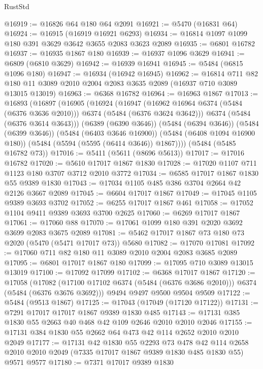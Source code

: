 \begin{lexlean}{RustStd}
\begin{coremodule}
{\begin{coremodule}
{{{{{{{{{{{{{{{{{{{{{{{{{{{{{{{@16919 := @16826 @64 @180 @64 @2091
@16921 := @5470 (@16831 @64)
@16924 := @16915 (@16919 @16921 @6293)
@16934 := @16814 @1097 @1099 @180 @391 @3629 @3642 @3655 @2083 @3623 @2089
@16935 := @6801 @16782
@16937 := @16935 @1867 @180
@16939 := @16937 @1096 @3629
@16941 := @6809 (@6810 @3629)
@16942 := @16939 @16941
@16945 := @5484 (@6815 @1096 @180)
@16947 := @16934 (@16942 @16945)
@16962 := @16814
    @711
    @82
    @180
    @11
    @3089
    @2010
    @2004
    @2083
    @3635
    @2089
    (@16937 @710 @3089 @13015 @13019)
@16963 := @6368 @16782
@16964 := @16963 @1867
@17013 := @16893
    (@16897
      (@16905
        (@16924
          (@16947
            (@16962 @16964 @6374 (@5484 (@6376 @3636 @2010)))
            @6374
            (@5484 (@6376 @3624 @3642)))
          @6374
          (@5484 (@6376 @3614 @3643)))
        (@6389 (@6390 @3646))
        (@5484 (@6394 @3646))
        (@5484 (@6399 @3646))
        (@5484 (@6403 @3646 @16900))
        (@5484 (@6408 @1094 @16900 @180))
        (@5484 (@5594 (@5595 (@6414 @3646)) @1867))))
    (@5484 (@5485 @16782 @73))
@17016 := @5411 (@5611 (@8696 @5613))
@17017 := @17016 @16782
@17020 := @5610 @17017 @1867 @1830
@17028 := @17020 @1107 @711 @1123 @180 @3707 @3712 @2010 @3772
@17034 := @6585 @17017 @1867 @1830 @55 @9389 @1830
@17043 := @17034 @1105 @485 @386 @3704 @2664 @42 @2126 @3667 @2089
@17045 := @6604 @17017 @1867
@17049 := @17045 @1105 @9389 @3693 @3702
@17052 := @6255 @17017 @1867 @461
@17058 := @17052 @1104 @9411 @9389 @3693 @3700 @2625
@17060 := @6269 @17017 @1867
@17061 := @17060 @88
@17070 := @17061 @1099 @180 @391 @2020 @3692 @3699 @2083 @3675 @2089
@17081 := @5462 @17017 @1867 @73 @180 @73 @2020 (@5470 (@5471 @17017 @73)) @5680
@17082 := @17070 @17081
@17092 := @17060 @711 @82 @180 @11 @3089 @2010 @2004 @2083 @3685 @2089
@17095 := @6801 @17017 @1867 @180
@17099 := @17095 @710 @3089 @13015 @13019
@17100 := @17092 @17099
@17102 := @6368 @17017 @1867
@17120 := @17058
    (@17082 (@17100 @17102 @6374 (@5484 (@6376 @3686 @2010))) @6374 (@5484 (@6376 @3676 @3692)))
    @9494
    @9497
    @9500
    @9504
    @9509
@17122 := @5484 (@9513 @1867)
@17125 := @17043 (@17049 (@17120 @17122))
@17131 := @7291 @17017 @17017 @1867 @9389 @1830 @485
@17143 := @17131 @385 @1830 @55 @2663 @40 @468 @42 @109 @2646 @2010 @2010 @2046
@17155 := @17131 @384 @1830 @55 @2662 @64 @473 @42 @114 @2652 @2010 @2010 @2049
@17177 := @17131
    @42
    @1830
    @55
    @2293
    @73
    @478
    @42
    @114
    @2658
    @2010
    @2010
    @2049
    (@7335 @17017 @1867 @9389 @1830 @485 @1830 @55)
    @9571
    @9577
@17180 := @7371 @17017 @9389 @1830
}}}}}}}}}}}}}}}}}}}}}}}}}}}}}}}
\end{coremodule}}
\end{coremodule}
\end{lexlean}
